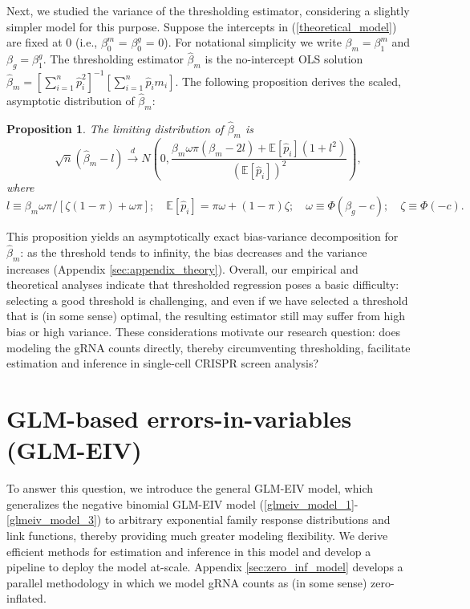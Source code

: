 \documentclass[12pt]{article}
\newtheorem{proposition}{Proposition}
\begin{document}
Next, we studied the variance of the thresholding estimator, considering a slightly simpler model for this purpose. Suppose the intercepts in (\ref{theoretical_model}) are fixed at $0$ (i.e., $\beta^m_0$ = $\beta^g_0$ = 0). For notational simplicity we write $\beta_m = \beta^m_1$ and $\beta_g = \beta^g_1.$ The thresholding estimator $\hat{\beta}_m$ is the no-intercept OLS solution $\hat{\beta}_m = \left[\sum_{i=1}^n \hat{p}_i^2 \right]^{-1}\left[\sum_{i=1}^n \hat{p}_i m_i \right].$ The following proposition derives the scaled, asymptotic distribution of $\hat{\beta}_m:$
\begin{proposition}\label{prop:bv_decomp}
	The limiting distribution of $\hat{\beta}_m$ is
	$$\sqrt{n}(\hat{\beta}_m - l) \xrightarrow{d} N\left(0, \frac{ \beta_m \omega\pi(\beta_m - 2l) + \mathbb{E}[\hat{p}_i](1 + l^2) }{\left(\mathbb{E}[\hat{p}_i]\right)^2} \right),$$ where $$l \equiv \beta_m \omega \pi/[\zeta(1-\pi) + \omega \pi]; \quad
	\mathbb{E}[\hat{p}_i] = \pi \omega + (1-\pi) \zeta; \quad
	\omega \equiv \Phi(\beta_g - c); \quad
	\zeta \equiv \Phi(-c).$$
\end{proposition}
This proposition yields an asymptotically exact bias-variance decomposition for $\hat{\beta}_m$: as the threshold tends to infinity, the bias decreases and the variance increases (Appendix \ref{sec:appendix_theory}). Overall, our empirical and theoretical analyses indicate that thresholded regression poses a basic difficulty: selecting a good threshold is challenging, and even if we have selected a threshold that is (in some sense) optimal, the resulting estimator still may suffer from high bias or high variance. These considerations motivate our research question: does modeling the gRNA counts directly, thereby circumventing thresholding, facilitate estimation and inference in single-cell CRISPR screen analysis?

\section{GLM-based errors-in-variables (GLM-EIV)}

To answer this question, we introduce the general GLM-EIV model, which generalizes the negative binomial GLM-EIV model (\ref{glmeiv_model_1}-\ref{glmeiv_model_3}) to arbitrary exponential family response distributions and link functions, thereby providing much greater modeling flexibility. We derive efficient methods for estimation and inference in this model and develop a pipeline to deploy the model at-scale. Appendix \ref{sec:zero_inf_model} develops a parallel methodology in which we model gRNA counts as (in some sense) zero-inflated.
 
\end{document}
